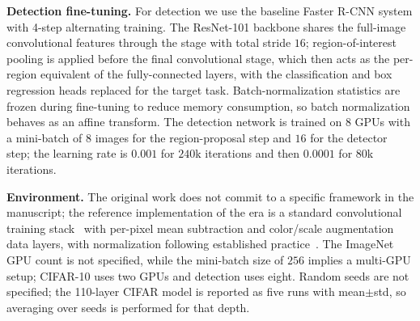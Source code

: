 \noindent\textbf{Detection fine-tuning.}
For detection we use the baseline Faster R-CNN system with 4-step alternating
training. The ResNet-101 backbone shares the full-image convolutional features
through the stage with total stride $16$; region-of-interest pooling is applied
before the final convolutional stage, which then acts as the per-region
equivalent of the fully-connected layers, with the classification and box
regression heads replaced for the target task. Batch-normalization statistics
are frozen during fine-tuning to reduce memory consumption, so batch
normalization behaves as an affine transform. The detection network is trained
on $8$ GPUs with a mini-batch of $8$ images for the region-proposal step and
$16$ for the detector step; the learning rate is $0.001$ for $240$k iterations
and then $0.0001$ for $80$k iterations.

\noindent\textbf{Environment.}
The original work does not commit to a specific framework in the manuscript; the
reference implementation of the era is a standard convolutional training
stack~\cite{caffe2014} with per-pixel mean subtraction and color/scale
augmentation data layers, with normalization following established
practice~\cite{efficientbackprop1998}. The ImageNet GPU count is not specified,
while the mini-batch size of $256$ implies a multi-GPU setup; CIFAR-10 uses two
GPUs and detection uses eight. Random seeds are not specified; the 110-layer
CIFAR model is reported as five runs with mean$\pm$std, so averaging over seeds
is performed for that depth.
